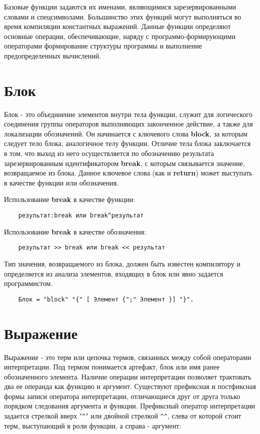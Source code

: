 {Базовые функции задаются их именами, являющимися зарезервированными словами и спецсимволами. Большинство этих функций могут выполняться во время компиляции константных выражений. Данные функции определяют основные операции, обеспечивающие, наряду с программо-формирующими операторами формирование структуры программы и выполнение предопределенных вычислений.

\section{Блок}

Блок - это объединение элементов внутри тела функции, служит для логического соединения группы операторов выполняющих законченное действие, а также для локализации обозначений. Он начинается с ключевого слова \textbf{block}, за которым следует тело блока, аналогичное телу функции. Отличие тела блока заключается в том, что выход из него осуществляется по обозначению результата зарезервированным идентификатором \textbf{break}, с которым связывается значение, возвращаемое из блока. Данное ключевое слова (как и \textbf{return}) может выступать в качестве функции или обозначения.

Использование \textbf{break} в качестве функции:

\begin{verbatim}
    результат:break или break^результат
\end{verbatim}

Использование \textbf{break} в качестве обозначения:

\begin{verbatim}
    результат >> break или break << результат
\end{verbatim}

Тип значения, возвращаемого из блока, должен быть известен компилятору и определяется из анализа элементов, входящих в блок или явно задается программистом.

\begin{verbatim}
    Блок = "block" "{" [ Элемент {";" Элемент }] "}".
\end{verbatim}

\section{Выражение}

Выражение - это терм или цепочка термов, связанных между собой операторами интерпретации. Под термом понимается артефакт, блок или имя ранее обозначенного элемента. Наличие операции интерпретации позволяет трактовать два ее операнда как функцию и аргумент. Существуют префиксная и постфиксная формы записи оператора интерпретации, отличающиеся друг от друга только порядком следования аргумента и функции. Префиксный оператор интерпретации задается стрелкой вверх "\verb|^|" или двойной стрелкой \verb|^^|, слева от которой стоит терм, выступающий в роли функции, а справа - аргумент:

}
